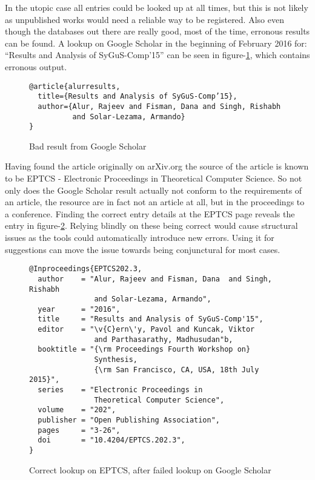In the utopic case all entries could be looked up at all times, but
this is not likely as unpublished works would need a reliable way to
be registered.  Also even though the databases out there are really
good, most of the time, erronous results can be found.  A lookup on
Google Scholar in the beginning of February 2016 for: ``Results and
Analysis of SyGuS-Comp’15'' can be seen in
figure-\ref{fig:scholar_bad_result}, which contains erronous output.

\begin{figure}[ht]
  \centering
\begin{verbatim}
@article{alurresults,
  title={Results and Analysis of SyGuS-Comp’15},
  author={Alur, Rajeev and Fisman, Dana and Singh, Rishabh
          and Solar-Lezama, Armando}
}
\end{verbatim}
  \caption{Bad result from Google Scholar}
\label{fig:scholar_bad_result}
\end{figure}

Having found the article originally on arXiv.org the source of the
article is known to be EPTCS - Electronic Proceedings in Theoretical
Computer Science.  So not only does the Google Scholar result actually
not conform to the requirements of an article, the resource are in
fact not an article at all, but in the proceedings to a conference.
Finding the correct entry details at the EPTCS page reveals the entry
in figure-\ref{fig:eptcs_lookup}.  Relying blindly on these being
correct would cause structural issues as the tools could automatically
introduce new errors.  Using it for suggestions can move the issue
towards being conjunctural for most cases.

\begin{figure}[ht]
  \centering
\begin{small}
\begin{verbatim}
@Inproceedings{EPTCS202.3,
  author    = "Alur, Rajeev and Fisman, Dana  and Singh, Rishabh 
               and Solar-Lezama, Armando",
  year      = "2016",
  title     = "Results and Analysis of SyGuS-Comp'15",
  editor    = "\v{C}ern\'y, Pavol and Kuncak, Viktor 
               and Parthasarathy, Madhusudan"b,
  booktitle = "{\rm Proceedings Fourth Workshop on}
               Synthesis,
               {\rm San Francisco, CA, USA, 18th July 2015}",
  series    = "Electronic Proceedings in 
               Theoretical Computer Science",
  volume    = "202",
  publisher = "Open Publishing Association",
  pages     = "3-26",
  doi       = "10.4204/EPTCS.202.3",
}
\end{verbatim}
\end{small}
  \caption{Correct lookup on EPTCS, after failed lookup on Google Scholar}
\label{fig:eptcs_lookup}
\end{figure}

